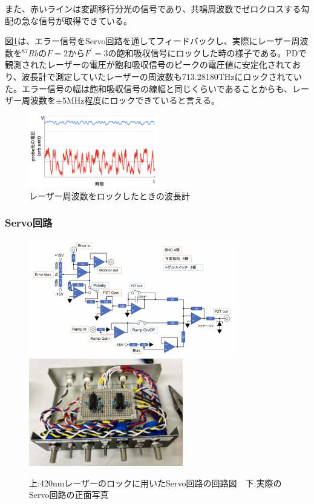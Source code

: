 \documentclass[dvipdfmx]{jsarticle}
\begin{document}
また、赤いラインは変調移行分光の信号であり、共鳴周波数でゼロクロスする勾配の急な信号が取得できている。

図\ref{fig:mt-lock}は、エラー信号をServo回路を通してフィードバックし、実際にレーザー周波数を$^{87}Rb$の$F=2$から$F^{'}=3$の飽和吸収信号にロックした時の様子である。PDで観測されたレーザーの電圧が飽和吸収信号のピークの電圧値に安定化されており、波長計で測定していたレーザーの周波数も713.28180THzにロックされていた。エラー信号の幅は飽和吸収信号の線幅と同じくらいであることからも、レーザー周波数を$\pm 5$MHz程度にロックできていると言える。
\begin{figure}
\centering
\includegraphics[width=0.5\textwidth]{images/mt_lock.png}
\caption{\label{fig:mt-lock}レーザー周波数をロックしたときの波長計}
\end{figure}

\subsubsection{Servo回路}

\begin{figure}
\centering
\includegraphics[width=0.8\textwidth]{images/servo.png}
\includegraphics[width=0.6\textwidth]{images/servo_real.jpg}
\caption{\label{fig:servo}上:420nmレーザーのロックに用いたServo回路の回路図　下:実際のServo回路の正面写真}
\end{figure}
\end{document}
